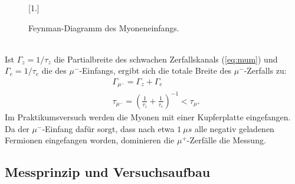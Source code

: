 		\begin{figure}[ht]
			\centering
			\scalebox{1.}[1.]{
			
			}
			\caption{Feynman-Diagramm des Myoneneinfangs.}
			\label{fig:myoneinfang}	
		\end{figure}
	\ \\
	Ist $\Gamma_z = 1/\tau_z$ die Partialbreite  des schwachen Zerfallskanals (\ref{eq:mum}) und $\Gamma_e=1/\tau_e$ die des $\mu^-$-Einfangs, ergibt sich die totale Breite des $\mu^-$-Zerfalls zu:
		\begin{align}
			&\Gamma_{\mu^-} = \Gamma_z + \Gamma_e\\
			&\tau_{\mu^-} = \left(\frac{1}{\tau_z} + \frac{1}{\tau_e}\right)^{-1} < \tau_{\mu^+}  
		\end{align}
	Im Praktikumsversuch werden die Myonen mit einer Kupferplatte eingefangen. Da der $\mu^-$-Einfang dafür sorgt, dass nach etwa $1\ \unit{\mu s}$ alle negativ geladenen Fermionen eingefangen worden, dominieren die $\mu^+$-Zerfälle die Messung. 
	
	\subsection{Messprinzip und Versuchsaufbau}
